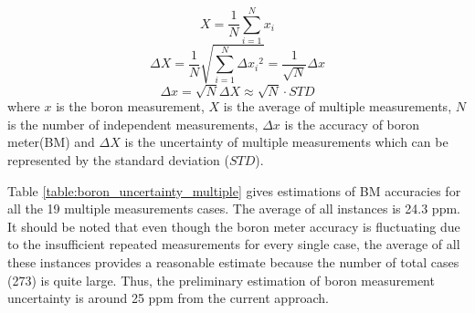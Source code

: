 \documentclass{article}
\begin{document}
\begin{equation}
\label{eq:boron_uncertainty_1}
  X=\frac{1}{N}\sum_{i=1}^N {x_i}
\end{equation}
\begin{equation}
\label{eq:boron_uncertainty_2}
  \Delta{X}=\frac{1}{N}\sqrt{\sum_{i=1}^N {\Delta{{x_i}}^{2}}}=\frac{1}{\sqrt{N}}\Delta{x}
\end{equation}
\begin{equation}
\label{eq:boron_uncertainty_3}
  \Delta{x}=\sqrt{N} \Delta{X} \approx \sqrt{N} \cdot {STD}
\end{equation}
where $x$ is the boron measurement, $X$ is the average of multiple measurements, $N$ is the number of independent measurements, $\Delta{x}$ is the accuracy of boron meter(BM) and $\Delta{X}$ is the uncertainty of multiple measurements which can be represented by the standard deviation (${STD}$).

Table \ref{table:boron_uncertainty_multiple} gives estimations of BM accuracies for all the 19 multiple measurements cases. The average of all instances is 24.3 ppm. It should be noted that even though the boron meter accuracy is fluctuating due to the insufficient repeated measurements for every single case, the average of all these instances provides a reasonable estimate because the number of total cases (273) is quite large. Thus, the preliminary estimation of boron measurement uncertainty is around 25 ppm from the current approach.
\end{document}
